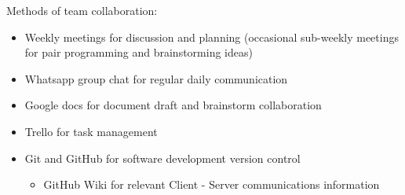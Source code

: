 Methods of team collaboration:
\begin{itemize}
\item Weekly meetings for discussion and planning (occasional sub-weekly meetings for pair programming and brainstorming ideas) 
\item Whatsapp group chat for regular daily communication
\item Google docs for document draft and brainstorm collaboration
\item Trello for task management
\item Git and GitHub for software development version control
\begin{itemize}
\item GitHub Wiki for relevant Client - Server communications information
\end{itemize}
\end{itemize}